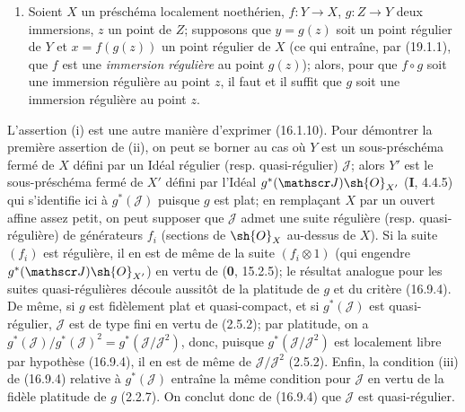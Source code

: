 \begin{proposition}[19.1.5]
\begin{enumerate}
\begin{enumerate}
  \end{enumerate}
  \item[\textup{(v)}] Soient $X$ un préschéma localement noethérien, $f:Y\to X$, $g:Z\to Y$ deux immersions, $z$ un point de $Z$; supposons que $y=g(z)$ soit un point régulier de $Y$ et $x=f(g(z))$ un point régulier
de $X$ \textup{(ce qui entraîne, par (19.1.1), que $f$ est une \emph{immersion régulière} au point $g(z)$)}; alors,
pour que $f\circ g$ soit une immersion régulière au point $z$, il faut et il suffit que $g$ soit une immersion régulière au point $z$.
\end{enumerate}
\end{proposition}

L'assertion (i) est une autre manière d'exprimer (16.1.10). Pour démontrer la première assertion de (ii), on peut se borner au cas où $Y$ est un sous-préschéma fermé de $X$ défini par un Idéal régulier (resp. quasi-régulier) $\mathscr J$; alors $Y'$ est le sous-préschéma fermé de $X'$ défini par l'Idéal $g^*(\mathscr J)\sh{O}_{X'}$ (\textbf{I}, 4.4.5) qui s'identifie ici à $g^*(\mathscr J)$ puisque $g$ est plat; en remplaçant $X$ par un ouvert affine assez petit, on peut supposer que $\mathscr J$ admet une suite régulière (resp. quasi-régulière) de générateurs $f_i$ (sections de $\sh{O}_X$ au-dessus de $X$). Si la suite $(f_i)$ est régulière, il en est de même de la suite $(f_i\otimes1)$ (qui engendre $g^*(\mathscr J)\sh{O}_{X'}$) en vertu de (\textbf{0}, 15.2.5); le résultat analogue pour les suites quasi-régulières découle aussitôt de la platitude de $g$ et du critère (16.9.4). De même, si $g$ est fidèlement plat et quasi-compact, et si $g^*(\mathscr J)$ est quasi-régulier, $\mathscr J$ est de type fini en vertu de (2.5.2); par platitude, on a $g^*(\mathscr J)/g^*(\mathscr J)^2=g^*(\mathscr J/\mathscr J^2)$, donc, puisque $g^*(\mathscr J/\mathscr J^2)$ est localement libre par hypothèse (16.9.4), il en est de même de $\mathscr J/\mathscr J^2$ (2.5.2). Enfin, la condition (iii) de (16.9.4) relative à $g^*(\mathscr J)$ entraîne la même condition pour $\mathscr J$ en vertu de la fidèle platitude de $g$ (2.2.7). On conclut donc de (16.9.4) que $\mathscr J$ est quasi-régulier.

